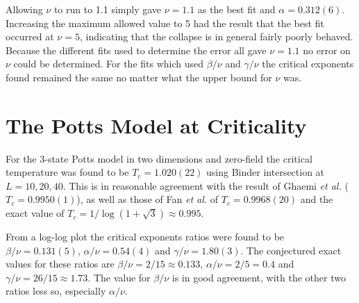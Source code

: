 \documentclass[11pt, a4paper]{report} %
\begin{document}
Allowing \(\nu\) to run to 1.1 simply gave \(\nu = 1.1\) as the best fit and \(\alpha = 0.312(6)\).
Increasing the maximum allowed value to 5 had the result that the best fit occurred at \(\nu=5\),
indicating that the collapse is in general fairly poorly behaved.
Because the different fits used to determine the error all gave \(\nu=1.1\) no error on \(\nu\) could be determined.
For the fits which used \(\beta/\nu\) and \(\gamma/\nu\) the critical exponents found remained the same no matter what the upper bound for \(\nu\) was.



\section{The Potts Model at Criticality}

For the 3-state Potts model in two dimensions and zero-field the critical temperature was found to be \(T_c=1.020(22)\) using Binder intersection at \(L = 10, 20, 40\).
This is in reasonable agreement with the result of Ghaemi \textit{et al.} \cite{ghaemi:2001} (\(T_c=0.9950(1)\)), as well as those of Fan \textit{et al.} \cite{fan:2007} of \(T_c = 0.9968(20)\) and the exact value of \(T_c = 1/\log(1+\sqrt{3}) \approx 0.995\).

From a log-log plot the critical exponents ratios were found to be \(\beta/\nu = 0.131(5)\), \(\alpha/\nu = 0.54(4)\) and \(\gamma/\nu = 1.80(3)\).
The conjectured exact values for these ratios are \(\beta/\nu = 2/15 \approx 0.133\), \(\alpha/\nu = 2/5 =0.4\) and \(\gamma/\nu = 26/15 \approx 1.73\).
The value for \(\beta/\nu\) is in good agreement, with the other two ratios less so, especially \(\alpha/\nu\).
\end{document}
